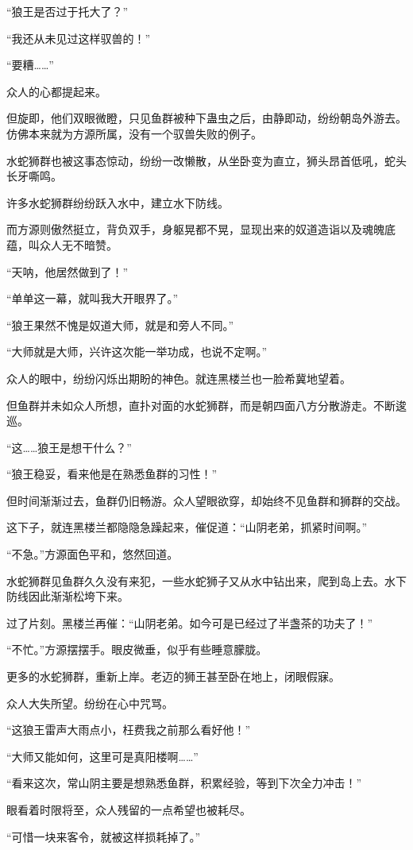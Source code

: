 \begin{this_body}
“狼王是否过于托大了？”

“我还从未见过这样驭兽的！”

“要糟……”

众人的心都提起来。

但旋即，他们双眼微瞪，只见鱼群被种下蛊虫之后，由静即动，纷纷朝岛外游去。仿佛本来就为方源所属，没有一个驭兽失败的例子。

水蛇狮群也被这事态惊动，纷纷一改懒散，从坐卧变为直立，狮头昂首低吼，蛇头长牙嘶鸣。

许多水蛇狮群纷纷跃入水中，建立水下防线。

而方源则傲然挺立，背负双手，身躯晃都不晃，显现出来的奴道造诣以及魂魄底蕴，叫众人无不暗赞。

“天呐，他居然做到了！”

“单单这一幕，就叫我大开眼界了。”

“狼王果然不愧是奴道大师，就是和旁人不同。”

“大师就是大师，兴许这次能一举功成，也说不定啊。”

众人的眼中，纷纷闪烁出期盼的神色。就连黑楼兰也一脸希冀地望着。

但鱼群并未如众人所想，直扑对面的水蛇狮群，而是朝四面八方分散游走。不断逡巡。

“这……狼王是想干什么？”

“狼王稳妥，看来他是在熟悉鱼群的习性！”

但时间渐渐过去，鱼群仍旧畅游。众人望眼欲穿，却始终不见鱼群和狮群的交战。

这下子，就连黑楼兰都隐隐急躁起来，催促道：“山阴老弟，抓紧时间啊。”

“不急。”方源面色平和，悠然回道。

水蛇狮群见鱼群久久没有来犯，一些水蛇狮子又从水中钻出来，爬到岛上去。水下防线因此渐渐松垮下来。

过了片刻。黑楼兰再催：“山阴老弟。如今可是已经过了半盏茶的功夫了！”

“不忙。”方源摆摆手。眼皮微垂，似乎有些睡意朦胧。

更多的水蛇狮群，重新上岸。老迈的狮王甚至卧在地上，闭眼假寐。

众人大失所望。纷纷在心中咒骂。

“这狼王雷声大雨点小，枉费我之前那么看好他！”

“大师又能如何，这里可是真阳楼啊……”

“看来这次，常山阴主要是想熟悉鱼群，积累经验，等到下次全力冲击！”

眼看着时限将至，众人残留的一点希望也被耗尽。

“可惜一块来客令，就被这样损耗掉了。”


\end{this_body}
